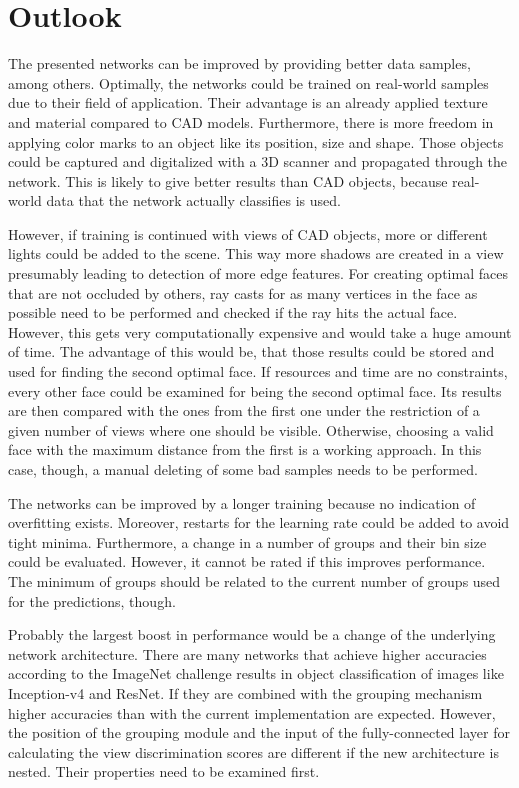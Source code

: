 \section{Outlook}
\label{sec:discussion-outlook}
The presented networks can be improved by providing better data samples, among others.
Optimally, the networks could be trained on real-world samples due to their field of application.
Their advantage is an already applied texture and material compared to CAD models.
Furthermore, there is more freedom in applying color marks to an object like its position, size and shape.
Those objects could be captured and digitalized with a 3D scanner and propagated through the network.
This is likely to give better results than CAD objects, because real-world data that the network actually classifies is used.

However, if training is continued with views of CAD objects, more or different lights could be added to the scene.
This way more shadows are created in a view presumably leading to detection of more edge features.
For creating optimal faces that are not occluded by others, ray casts for as many vertices in the face as possible need to be performed and checked if the ray hits the actual face.
However, this gets very computationally expensive and would take a huge amount of time.
The advantage of this would be, that those results could be stored and used for finding the second optimal face.
If resources and time are no constraints, every other face could be examined for being the second optimal face.
Its results are then compared with the ones from the first one under the restriction of a given number of views where one should be visible.
Otherwise, choosing a valid face with the maximum distance from the first is a working approach.
In this case, though, a manual deleting of some bad samples needs to be performed.

The networks can be improved by a longer training because no indication of overfitting exists.
Moreover, restarts for the learning rate could be added to avoid tight minima.
Furthermore, a change in a number of groups and their bin size could be evaluated.
However, it cannot be rated if this improves performance.
The minimum of groups should be related to the current number of groups used for the predictions, though.

Probably the largest boost in performance would be a change of the underlying network architecture.
There are many networks that achieve higher accuracies according to the ImageNet challenge results in object classification of images like Inception-v4 and ResNet.
If they are combined with the grouping mechanism higher accuracies than with the current implementation are expected.
However, the position of the grouping module and the input of the fully-connected layer for calculating the view discrimination scores are different if the new architecture is nested.
Their properties need to be examined first.